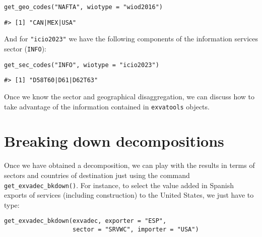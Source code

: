 \begin{verbatim}
get_geo_codes("NAFTA", wiotype = "wiod2016")
\end{verbatim}

\begin{verbatim}
#> [1] "CAN|MEX|USA"
\end{verbatim}

And for \texttt{"icio2023"} we have the following components of the information
services sector (\texttt{INFO}):

\begin{verbatim}
get_sec_codes("INFO", wiotype = "icio2023")
\end{verbatim}

\begin{verbatim}
#> [1] "D58T60|D61|D62T63"
\end{verbatim}

Once we know the sector and geographical disaggregation, we can discuss
how to take advantage of the information contained in \texttt{exvatools} objects.

\hypertarget{breaking-down-decompositions}{%
\section{Breaking down decompositions}\label{breaking-down-decompositions}}

Once we have obtained a decomposition, we can play with the results in terms of
sectors and countries of destination just using the command
\texttt{get\_exvadec\_bkdown()}. For instance, to select the value added in Spanish
exports of services (including construction) to the United States, we just have
to type:

\begin{verbatim}
get_exvadec_bkdown(exvadec, exporter = "ESP", 
                   sector = "SRVWC", importer = "USA")
\end{verbatim}

